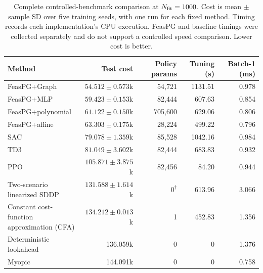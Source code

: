 \begin{table}[H]
\caption{Complete controlled-benchmark comparison at $N_{\rm fit}=1000$.
Cost is mean $\pm$ sample SD over five training seeds, with one run for each fixed
method. Timing records each implementation's CPU execution. FeasPG and
baseline timings were collected separately and do not support a
controlled speed comparison. Lower cost is better.}
\label{tab:synthetic-full}
\centering
\small
\setlength{\tabcolsep}{3.1pt}
\begin{tabular}{@{}lrrrr@{}}
\toprule
Method & Test cost & Policy params & Tuning (s) & Batch-1 (ms)\\
\midrule
FeasPG+Graph & $54.512\pm0.573$k & 54,721 & 1131.51 & 0.978\\
FeasPG+MLP & $59.423\pm0.153$k & 82,444 & 607.63 & 0.854\\
FeasPG+polynomial & $61.122\pm0.150$k & 705,600 & 629.06 & 0.806\\
FeasPG+affine & $63.303\pm0.175$k & 28,224 & 499.22 & 0.796\\
SAC & $79.078\pm1.359$k & 85,528 & 1042.16 & 0.984\\
TD3 & $81.049\pm3.602$k & 82,444 & 683.83 & 0.932\\
PPO & $105.871\pm3.875$k & 82,456 & 84.20 & 0.944\\
\shortstack[l]{Two-scenario\\linearized SDDP} & $131.588\pm1.614$k & $0^\dagger$ & 613.96 & 3.066\\
\shortstack[l]{Constant cost-function\\approximation (CFA)} & $134.212\pm0.013$k & 1 & 452.83 & 1.356\\
Deterministic lookahead & 136.059k & 0 & 0 & 1.376\\
Myopic & 144.091k & 0 & 0 & 0.758\\
\bottomrule
\end{tabular}
\end{table}
